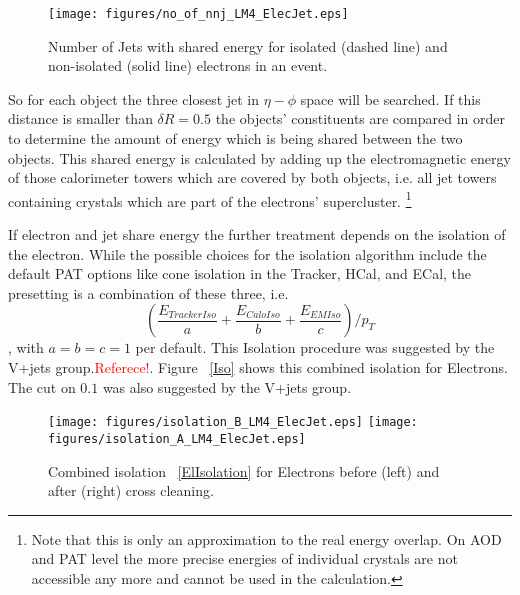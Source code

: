 \documentclass{cmspaper}
\begin{document}
\begin{figure}[hbtp]
  \begin{center}
    \texttt{[image: figures/no\_of\_nnj\_LM4\_ElecJet.eps]}
    \caption{Number of Jets with shared energy for isolated (dashed line) and non-isolated (solid line) electrons in an event.}
    \label{fig:NbJets}
  \end{center}
\end{figure}

 So for each object the three closest jet in \( \eta-\phi\) space will be searched. If this distance is smaller than $\delta R=0.5$ the objects'
constituents are compared in order to determine the amount of energy which is
being shared between the two objects. This shared energy is calculated by adding up the electromagnetic energy of
those calorimeter towers which are covered by both objects, i.e. all jet towers
containing crystals which are part of the electrons' supercluster.
\footnote{Note that this is only an approximation to the real energy overlap. On
AOD and PAT level the more precise energies of individual crystals are not
accessible any more and cannot be used in the calculation.}

If electron and jet share energy the further treatment depends on the isolation
of the electron. While the possible choices for the isolation algorithm include the default PAT options like cone isolation in the Tracker, HCal, and ECal, the presetting is a combination of these three, i.e. \begin{equation} \label{ElIsolation}(\frac{E_{TrackerIso}}{a} + \frac{E_{CaloIso}}{b} + \frac{E_{EMIso}}{c})/p_T\end{equation}, with \(a=b=c=1\) per default. This Isolation procedure was suggested by the V+jets group.\textcolor{red}{Referece!}. Figure ~\ref{Iso} shows this combined isolation for Electrons. The cut on \(0.1\) was also suggested by the V+jets group. \\

\begin{figure}[hbtp]
  \begin{center}
    \texttt{[image: figures/isolation\_B\_LM4\_ElecJet.eps]}
    \texttt{[image: figures/isolation\_A\_LM4\_ElecJet.eps]}
    \caption{Combined isolation ~\ref{ElIsolation} for Electrons before (left) and after (right) cross cleaning.}
    \label{fig:ElectronIsolation}
  \end{center}
\end{figure}
\end{document}

